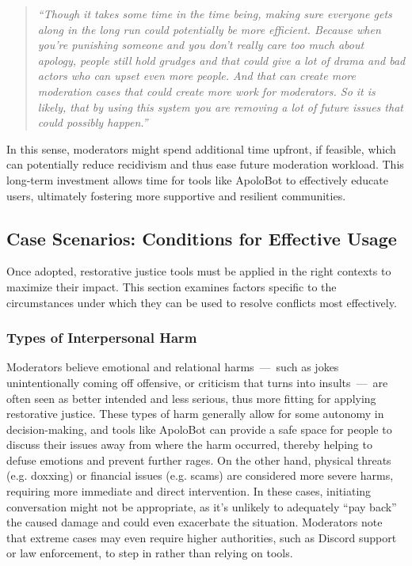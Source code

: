 \begin{quote}
\textit{``Though it takes some time in the time being, making sure everyone gets along in the long run could potentially be more efficient. Because when you're punishing someone and you don't really care too much about apology, people still hold grudges and that could give a lot of drama and bad actors who can upset even more people. And that can create more moderation cases that could create more work for moderators. So it is likely, that by using this system you are removing a lot of future issues that could possibly happen.''}
\end{quote}

In this sense, moderators might spend additional time upfront, if feasible, which can potentially reduce recidivism and thus ease future moderation workload. This long-term investment allows time for tools like ApoloBot to effectively educate users, ultimately fostering more supportive and resilient communities.

\subsection{Case Scenarios: Conditions for Effective Usage}
Once adopted, restorative justice tools must be applied in the right contexts to maximize their impact. This section examines factors specific to the circumstances under which they can be used to resolve conflicts most effectively.

\subsubsection{Types of Interpersonal Harm} Moderators believe emotional and relational harms~---~such as jokes unintentionally coming off offensive, or criticism that turns into insults~---~are often seen as better intended and less serious, thus more fitting for applying restorative justice. These types of harm generally allow for some autonomy in decision-making, and tools like ApoloBot can provide a safe space for people to discuss their issues away from where the harm occurred, thereby helping to defuse emotions and prevent further rages. On the other hand, physical threats (e.g. doxxing) or financial issues (e.g. scams) are considered more severe harms, requiring more immediate and direct intervention. In these cases, initiating conversation might not be appropriate, as it's unlikely to adequately ``pay back'' the caused damage and could even exacerbate the situation. Moderators note that extreme cases may even require higher authorities, such as Discord support or law enforcement, to step in rather than relying on tools.

